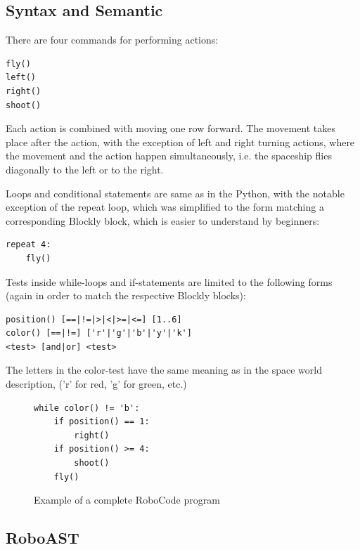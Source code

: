 \subsection{Syntax and Semantic}
\label{sec:syntax-semantic}


There are four commands for performing actions:
\begin{lstlisting}
fly()
left()
right()
shoot()
\end{lstlisting}
Each action is combined with moving one row forward.
The movement takes place after the action, with the exception of left and right turning actions, where the movement and the action happen simultaneously,
i.e. the spaceship flies diagonally to the left or to the right.

Loops and conditional statements are same as in the Python,
with the notable exception of the repeat loop,
which was simplified to the form matching a corresponding
Blockly block, which is easier to understand by beginners:
\begin{lstlisting}
repeat 4:
    fly()
\end{lstlisting}

Tests inside while-loops and if-statements are limited to the following forms
(again in order to match the respective Blockly blocks):
\begin{lstlisting}
position() [==|!=|>|<|>=|<=] [1..6]
color() [==|!=] ['r'|'g'|'b'|'y'|'k']
<test> [and|or] <test>
\end{lstlisting}
The letters in the color-test have the same meaning as in the space world description,
('r' for red, 'g' for green, etc.)


\begin{figure}[h]
\begin{lstlisting}
while color() != 'b':
    if position() == 1:
        right()
    if position() >= 4:
        shoot()
    fly()
\end{lstlisting}
\caption{Example of a complete RoboCode program}
\label{fig:robocode-example}
\end{figure}


\subsection{RoboAST}

